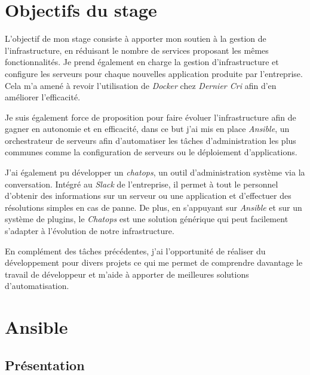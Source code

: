 \newpage

\section{Objectifs du stage}\label{objectifs-du-stage}

\bigskip

L'objectif de mon stage consiste à apporter mon soutien à la gestion de
l'infrastructure, en réduisant le nombre de services proposant les mêmes
fonctionnalités. Je prend également en charge la gestion
d'infrastructure et configure les serveurs pour chaque nouvelles
application produite par l'entreprise. Cela m'a amené à revoir
l'utilisation de \emph{Docker} chez \emph{Dernier Cri} afin d'en
améliorer l'efficacité.

\bigskip

Je suis également force de proposition pour faire évoluer
l'infrastructure afin de gagner en autonomie et en efficacité, dans ce
but j'ai mis en place \emph{Ansible}, un orchestrateur de serveurs afin
d'automatiser les tâches d'administration les plus communes comme la
configuration de serveurs ou le déploiement d'applications.

\bigskip

J'ai également pu développer un \emph{chatops}, un outil
d'administration système via la conversation. Intégré au \emph{Slack} de
l'entreprise, il permet à tout le personnel d'obtenir des informations
sur un serveur ou une application et d'effectuer des résolutions simples
en cas de panne. De plus, en s'appuyant sur \emph{Ansible} et sur un
système de plugins, le \emph{Chatops} est une solution générique qui
peut facilement s'adapter à l'évolution de notre infrastructure.

\bigskip

En complément des tâches précédentes, j'ai l'opportunité de réaliser du
développement pour divers projets ce qui me permet de comprendre
davantage le travail de développeur et m'aide à apporter de meilleures
solutions d'automatisation.

\newpage

\section{Ansible}\label{ansible}

\bigskip

\subsection{Présentation}\label{pruxe9sentation}

